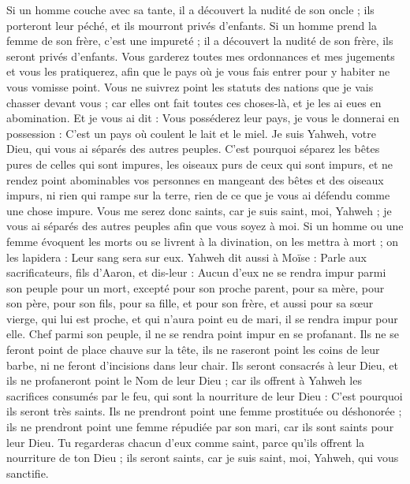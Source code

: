 \begin{multicols}{2}
Si un homme couche avec sa tante, il a découvert la nudité de son oncle ; ils porteront leur péché, et ils mourront privés d'enfants.
Si un homme prend la femme de son frère, c'est une impureté ; il a découvert la nudité de son frère, ils seront privés d'enfants.
Vous garderez toutes mes ordonnances et mes jugements et vous les pratiquerez, afin que le pays où je vous fais entrer pour y habiter ne vous vomisse point.
Vous ne suivrez point les statuts des nations que je vais chasser devant vous ; car elles ont fait toutes ces choses-là, et je les ai eues en abomination.
Et je vous ai dit : Vous posséderez leur pays, je vous le donnerai en possession : C'est un pays où coulent le lait et le miel. Je suis Yahweh, votre Dieu, qui vous ai séparés des autres peuples.
C'est pourquoi séparez les bêtes pures de celles qui sont impures, les oiseaux purs de ceux qui sont impurs, et ne rendez point abominables vos personnes en mangeant des bêtes et des oiseaux impurs, ni rien qui rampe sur la terre, rien de ce que je vous ai défendu comme une chose impure.
Vous me serez donc saints, car je suis saint, moi, Yahweh ; je vous ai séparés des autres peuples afin que vous soyez à moi.
Si un homme ou une femme évoquent les morts ou se livrent à la divination, on les mettra à mort ; on les lapidera : Leur sang sera sur eux.
\VerseOne{}Yahweh dit aussi à Moïse : Parle aux sacrificateurs, fils d'Aaron, et dis-leur : Aucun d'eux ne se rendra impur parmi son peuple pour un mort,
excepté pour son proche parent, pour sa mère, pour son père, pour son fils, pour sa fille, et pour son frère,
et aussi pour sa sœur vierge, qui lui est proche, et qui n'aura point eu de mari, il se rendra impur pour elle.
Chef parmi son peuple, il ne se rendra point impur en se profanant.
Ils ne se feront point de place chauve sur la tête, ils ne raseront point les coins de leur barbe, ni ne feront d'incisions dans leur chair.
Ils seront consacrés à leur Dieu, et ils ne profaneront point le Nom de leur Dieu ; car ils offrent à Yahweh les sacrifices consumés par le feu, qui sont la nourriture de leur Dieu : C'est pourquoi ils seront très saints.
Ils ne prendront point une femme prostituée ou déshonorée ; ils ne prendront point une femme répudiée par son mari, car ils sont saints pour leur Dieu.
Tu regarderas chacun d'eux comme saint, parce qu'ils offrent la nourriture de ton Dieu ; ils seront saints, car je suis saint, moi, Yahweh, qui vous sanctifie.

\end{multicols}

